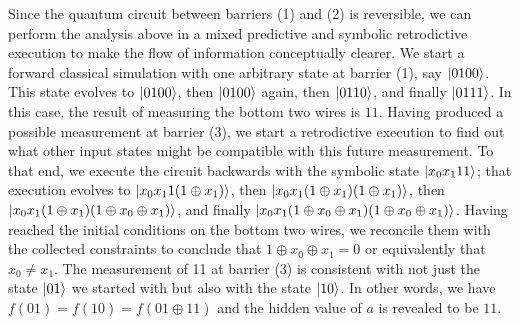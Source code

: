 \documentclass{article}
\begin{document}
Since the quantum circuit between barriers (1) and (2) is reversible,
we can perform the analysis above in a mixed predictive and symbolic
retrodictive execution to make the flow of information conceptually
clearer. We start a forward classical simulation with one arbitrary
state at barrier (1), say $\ket{0100}$.  This state evolves to
$\ket{0100}$, then $\ket{0100}$ again, then $\ket{0110}$, and finally
$\ket{0111}$. In this case, the result of measuring the bottom two
wires is $11$. Having produced a possible measurement at barrier (3),
we start a retrodictive execution to find out what other input states
might be compatible with this future measurement. To that end, we
execute the circuit backwards with the symbolic state
$\ket{x_0x_111}$; that execution evolves to $\ket{x_0x_11(1\oplus
  x_1)}$, then $\ket{x_0x_1(1\oplus x_1)(1\oplus x_1)}$, then
$\ket{x_0x_1(1\oplus x_1)(1\oplus x_0 \oplus x_1)}$, and finally
$\ket{x_0x_1(1\oplus x_0 \oplus x_1)(1\oplus x_0 \oplus x_1)}$. Having
reached the initial conditions on the bottom two wires, we reconcile
them with the collected constraints to conclude that $1 \oplus x_0
\oplus x_1 = 0$ or equivalently that $x_0 \neq x_1$. The measurement
of 11 at barrier (3) is consistent with not just the state $\ket{01}$
we started with but also with the state $\ket{10}$. In other words, we
have $f(01) = f(10) = f(01 \oplus 11)$ and the hidden value of $a$ is
revealed to be $11$.
\end{document}
